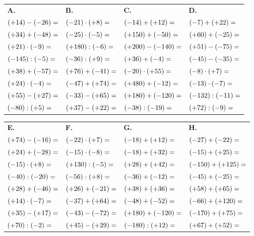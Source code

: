 {\small
\bigskip
\def\arraystretch{1.2}
\begin{tabularx}{\linewidth}{*{4}{X}}
\textbf{A.} & \textbf{B.} & \textbf{C.} & \textbf{D.} \\
$(+14)-(-26)= \dotfill$ & $(-21)\cdot(+8)= \dotfill$ & $(-14)+(+12)= \dotfill$ & $(-7)+(+22)= \dotfill$ \\
$(+34)+(-48)= \dotfill$ & $(-25)\cdot(-5)= \dotfill$ & $(+150)+(-50)= \dotfill$ & $(+60)+(-25)= \dotfill$ \\
$(+21)\cdot(-9)= \dotfill$ & $(+180):(-6)= \dotfill$ & $(+200)-(-140)= \dotfill$ & $(+51)-(-75)= \dotfill$ \\
$(-145):(-5)= \dotfill$ & $(-36):(+9)= \dotfill$ & $(+36)+(-4)= \dotfill$ & $(-45)-(-35)= \dotfill$ \\
$(+38)+(-57)= \dotfill$ & $(+76)+(-41)= \dotfill$ & $(-20)\cdot(+55)= \dotfill$ & $(-8)\cdot(+7)= \dotfill$ \\
$(+24)\cdot(-4)= \dotfill$ & $(-47)+(+74)= \dotfill$ & $(+480)+(-12)= \dotfill$ & $(-13)\cdot(-7)= \dotfill$ \\
$(+55)-(+27)= \dotfill$ & $(-33)-(+65)= \dotfill$ & $(+180)+(-120)= \dotfill$ & $(-132):(-11)= \dotfill$ \\
$(-80):(+5)= \dotfill$ & $(+37)-(+22)= \dotfill$ & $(-38):(-19)= \dotfill$ & $(+72):(-9)= \dotfill$ \\
\end{tabularx}

\bigskip
\begin{tabularx}{\linewidth}{*{4}{X}}
\textbf{E.} & \textbf{F.} & \textbf{G.} & \textbf{H.} \\
$(+74)-(-16)= \dotfill$ & $(-22)\cdot(+7)= \dotfill$ & $(-18)+(+12)= \dotfill$ & $(-27)+(-22)= \dotfill$ \\
$(+24)+(-28)= \dotfill$ & $(-15)\cdot(-8)= \dotfill$ & $(-18)+(+32)= \dotfill$ & $(-15)+(+25)= \dotfill$ \\
$(-15)\cdot(+8)= \dotfill$ & $(+130):(-5)= \dotfill$ & $(+28)+(+42)= \dotfill$ & $(-150)+(+125)= \dotfill$ \\
$(-40):(-20)= \dotfill$ & $(-56):(+8)= \dotfill$ & $(-36)+(-12)= \dotfill$ & $(-45)+(-25)= \dotfill$ \\
$(+28)+(-46)= \dotfill$ & $(+26)+(-21)= \dotfill$ & $(+38)+(+36)= \dotfill$ & $(+58)+(+65)= \dotfill$ \\
$(+14)\cdot(-7)= \dotfill$ & $(-37)+(+64)= \dotfill$ & $(-48)+(-52)= \dotfill$ & $(-66)+(+120)= \dotfill$ \\
$(+35)-(+17)= \dotfill$ & $(-43)-(-72)= \dotfill$ & $(+180)+(-120)= \dotfill$ & $(-170)+(+75)= \dotfill$ \\
$(+70):(-2)= \dotfill$ & $(+45)-(+29)= \dotfill$ & $(-180):(+12)= \dotfill$ & $(+67)+(+52)= \dotfill$ \\
\end{tabularx}

}
